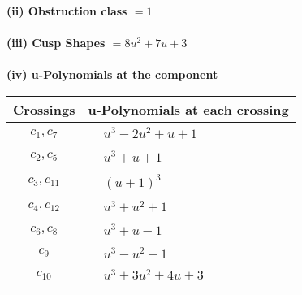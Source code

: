 \documentclass[1p]{elsarticle_modified}
\theoremstyle{definition}
\begin{document}
\flushleft \textbf{(ii) Obstruction class $= 1$}\\~\\
\flushleft \textbf{(iii) Cusp Shapes $= 8 u^2+7 u+3$}\\~\\
\newpage\renewcommand{\arraystretch}{1}
\flushleft \textbf{(iv) u-Polynomials at the component}\newline \\
\begin{tabular}{m{50pt}|m{274pt}}
Crossings & \hspace{64pt}u-Polynomials at each crossing \\
\hline $$\begin{aligned}c_{1},c_{7}\end{aligned}$$&$\begin{aligned}
&u^3-2 u^2+u+1
\end{aligned}$\\
\hline $$\begin{aligned}c_{2},c_{5}\end{aligned}$$&$\begin{aligned}
&u^3+u+1
\end{aligned}$\\
\hline $$\begin{aligned}c_{3},c_{11}\end{aligned}$$&$\begin{aligned}
&(u+1)^3
\end{aligned}$\\
\hline $$\begin{aligned}c_{4},c_{12}\end{aligned}$$&$\begin{aligned}
&u^3+u^2+1
\end{aligned}$\\
\hline $$\begin{aligned}c_{6},c_{8}\end{aligned}$$&$\begin{aligned}
&u^3+u-1
\end{aligned}$\\
\hline $$\begin{aligned}c_{9}\end{aligned}$$&$\begin{aligned}
&u^3- u^2-1
\end{aligned}$\\
\hline $$\begin{aligned}c_{10}\end{aligned}$$&$\begin{aligned}
&u^3+3 u^2+4 u+3
\end{aligned}$\\
\hline
\end{tabular}\\~\\
\end{document}
